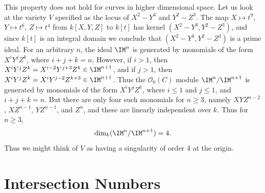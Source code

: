 \begin{example}
    This property does not hold for curves in higher dimensional space. Let us look at the variety $V$ specified as the locus of $X^2 - Y^3$ and $Y^2 - Z^3$. The map $X \mapsto t^9$, $Y \mapsto t^6$, $Z \mapsto t^4$ from $k[X,Y,Z]$ to $k[t]$ has kernel $(X^2 - Y^3, Y^2 - Z^3)$, and since $k[t]$ is an integral domain we conclude that $(X^2 - Y^3, Y^2 - Z^3)$ is a prime ideal. For an arbitrary $n$, the ideal $\IM^n$ is generated by monomials of the form $X^iY^jZ^k$, where $i + j + k = n$. However, if $i > 1$, then $X^iY^jZ^k = X^{i-2}Y^{j+3}Z^k \in \IM^{n+1}$, and if $j > 1$, then $X^iY^jZ^k = X^iY^{j-2}Z^{k+3} \in \IM^{n+1}$. Thus the $\mathcal{O}_0(C)$ module $\IM^n/\IM^{n+1}$ is generated by monomials of the form $X^iY^jZ^k$, where $i \leq 1$ and $j \leq 1$, and $i + j + k = n$. But there are only four such monomials for $n \geq 3$, namely $XYZ^{n-2}$, $XZ^{n-1}$, $YZ^{n-1}$, and $Z^n$, and these are linearly independent over $k$. Thus for $n \geq 3$,
    \[ \dim_k(\IM^n/\IM^{n+1}) = 4. \]
    Thus we might think of $V$ as having a singularity of order 4 at the origin.
\end{example}

\section{Intersection Numbers}

